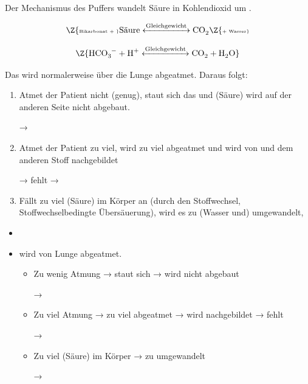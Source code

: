 {%
Der Mechanismus des Puffers wandelt Säure  in Kohlendioxid  um .

\begin{equation}
\ce{$\text{\Z{\tiny Bikarbonat + }}$ $\text{Säure}$
        <->[\text{Gleichgewicht}] CO2 $\text{\Z{\tiny + Wasser}}$}
\end{equation}

\begin{equation}
\Z{\ce{HCO3^- + H^+ <->[\text{Gleichgewicht}] CO2 +
        H2O}}
\end{equation}        
        
Das  wird normalerweise über die Lunge abgeatmet. Daraus folgt: 

\begin{enumerate}
  \item Atmet der Patient nicht (genug), staut
  sich das  und  (Säure) wird auf der anderen Seite nicht
  abgebaut.
  
  → 
  \item Atmet der Patient zu viel, wird zu viel
   abgeatmet und wird von  und dem
  anderen Stoff nachgebildet 
  
  → 
  fehlt → 
  \item Fällt zu viel  (Säure) im
  Körper an (durch den Stoffwechsel, Stoffwechselbedingte Übersäuerung), wird
  es zu (Wasser und)  umgewandelt, 
\end{enumerate}
}{%
\begin{itemize}
  \item {}
  \item {} wird von Lunge abgeatmet.
  \begin{itemize}
    \item Zu wenig Atmung →  staut
    sich →  wird nicht abgebaut
    
    → 
    \item Zu viel Atmung → zu viel  abgeatmet →  wird
    nachgebildet → 
    fehlt 
    
    → 
    \item Zu viel  (Säure) im
    Körper → zu  umgewandelt 
    
    → 
  \end{itemize}
\end{itemize}
}{}{}{}












